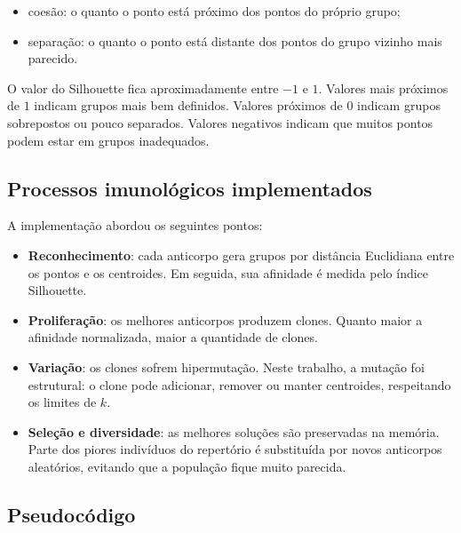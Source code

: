 \documentclass[12pt,a4paper]{article}
\begin{document}
\begin{itemize}
    \item coesão: o quanto o ponto está próximo dos pontos do próprio grupo;
    \item separação: o quanto o ponto está distante dos pontos do grupo vizinho mais parecido.
\end{itemize}

O valor do Silhouette fica aproximadamente entre \(-1\) e \(1\). Valores mais próximos de \(1\) indicam grupos mais bem definidos. Valores próximos de \(0\) indicam grupos sobrepostos ou pouco separados. Valores negativos indicam que muitos pontos podem estar em grupos inadequados.

\subsection{Processos imunológicos implementados}

A implementação abordou os seguintes pontos:

\begin{itemize}
    \item \textbf{Reconhecimento}: cada anticorpo gera grupos por distância Euclidiana entre os pontos e os centroides. Em seguida, sua afinidade é medida pelo índice Silhouette.
    \item \textbf{Proliferação}: os melhores anticorpos produzem clones. Quanto maior a afinidade normalizada, maior a quantidade de clones.
    \item \textbf{Variação}: os clones sofrem hipermutação. Neste trabalho, a mutação foi estrutural: o clone pode adicionar, remover ou manter centroides, respeitando os limites de \(k\).
    \item \textbf{Seleção e diversidade}: as melhores soluções são preservadas na memória. Parte dos piores indivíduos do repertório é substituída por novos anticorpos aleatórios, evitando que a população fique muito parecida.
\end{itemize}

\subsection{Pseudocódigo}
\end{document}
